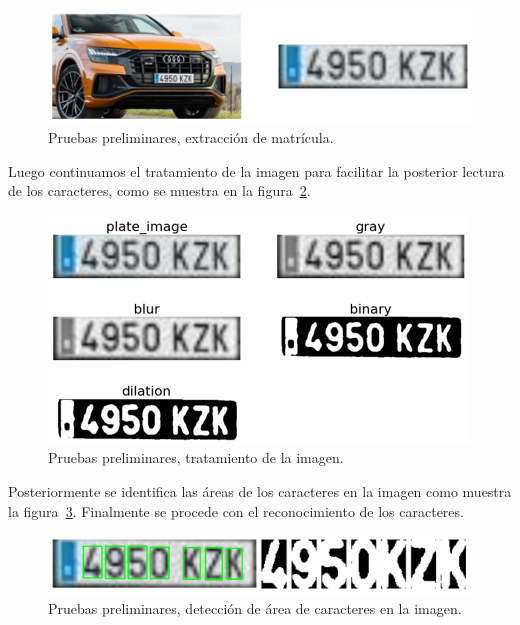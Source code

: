  \begin{figure}[!h]
    \centering
    \includegraphics[scale = 1]{Figures/figura_55.PNG}
    \decoRule
    \caption[Pruebas preliminares, extracción de matrícula]{Pruebas preliminares, extracción de matrícula.}
    \label{fig:55}
\end{figure}

Luego continuamos el tratamiento de la imagen para facilitar la posterior lectura de los caracteres, como se muestra en la figura~\ref{fig:56}.

 \begin{figure}[!h]
    \centering
    \includegraphics[scale = 1]{Figures/figura_56.PNG}
    \decoRule
    \caption[Pruebas preliminares, tratamiento de la imagen]{Pruebas preliminares, tratamiento de la imagen.}
    \label{fig:56}
\end{figure}

Posteriormente se identifica las áreas de los caracteres en la imagen como muestra la figura~\ref{fig:57}. Finalmente se procede con el reconocimiento de los caracteres.

 \begin{figure}[!h]
    \centering
    \includegraphics[scale = 0.85]{Figures/figura_57.PNG}
    \decoRule
    \caption[Pruebas preliminares, detección de área de caracteres en la imagen]{Pruebas preliminares, detección de área de caracteres en la imagen.}
    \label{fig:57}
\end{figure}


